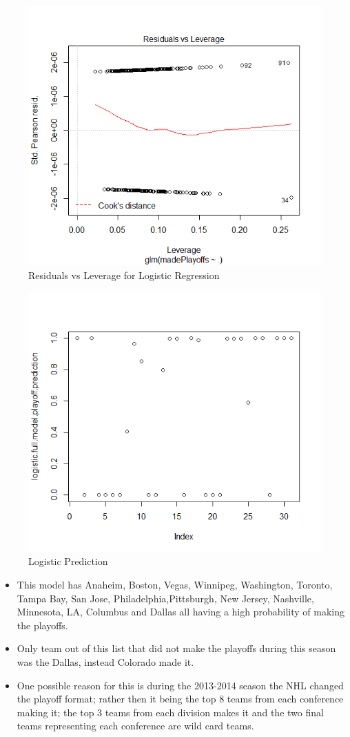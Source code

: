 \documentclass{beamer}
\begin{document}
\begin{frame}
	\begin{figure}
		\centering
		\includegraphics[width=0.7\linewidth]{Log4}
		\caption{Residuals vs Leverage for Logistic Regression}
		\label{fig:Residuals vs Leverage for Logistic Regression}
	\end{figure}
\end{frame}
\begin{frame}
	\begin{figure}
		\centering
		\includegraphics[width=0.7\linewidth]{"Logistic Prediction"}
		\caption{Logistic Prediction}
		\label{fig:Logistic Prediction}
	\end{figure}
\end{frame}
\begin{frame}
	\begin{itemize}
		\item This model has Anaheim, Boston, Vegas, Winnipeg, Washington, Toronto, Tampa Bay, San Jose, Philadelphia,Pittsburgh, New Jersey, Nashville, Minnesota, LA, Columbus and Dallas all having a high probability of making the playoffs.
		\item Only team out of this list that did not make the playoffs during this season was the Dallas, instead Colorado made it.
		\item One possible reason for this is during the 2013-2014 season the NHL changed the playoff format; rather then it being the top 8 teams from each conference making it; the top 3 teams from each division makes it and the two final teams representing each conference are wild card teams.
	\end{itemize}
\end{frame}
\end{document}
